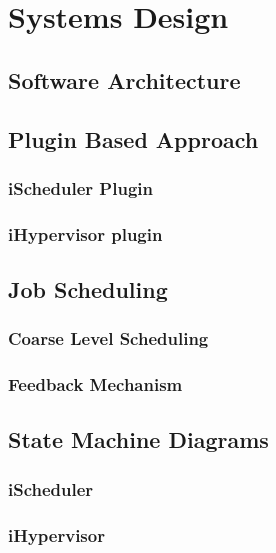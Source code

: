 \chapter{Systems Design}\label{chapter:systems design}
\section{Software Architecture}
\section{Plugin Based Approach}
\subsection{iScheduler Plugin}
\subsection{iHypervisor plugin}
\section{Job Scheduling}
\subsection{Coarse Level Scheduling}
\subsection{Feedback Mechanism}
\section{State Machine Diagrams}
\subsection{iScheduler}
\subsection{iHypervisor}
